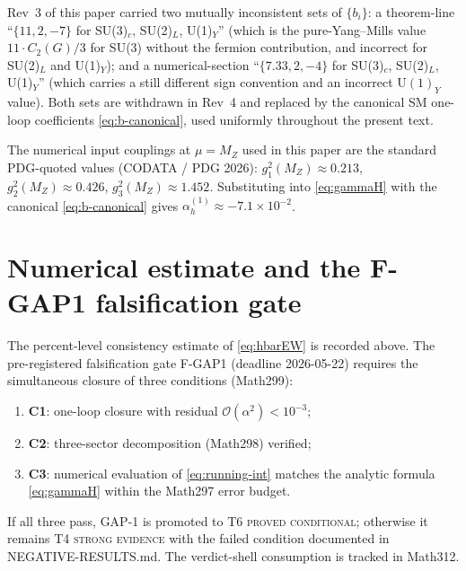 \begin{remark}\label{rmk:b-fixed}
Rev~3 of this paper carried two mutually inconsistent sets of
$\{b_i\}$: a theorem-line ``$\{11, 2, -7\}$ for SU(3)$_c$,
SU(2)$_L$, U(1)$_Y$'' (which is the pure-Yang--Mills value
$11\cdot C_2(G)/3$ for SU(3) without the fermion contribution, and
incorrect for SU(2)$_L$ and U(1)$_Y$); and a numerical-section
``$\{7.33, 2, -4\}$ for SU(3)$_c$, SU(2)$_L$, U(1)$_Y$''
(which carries a still different sign convention and an incorrect
$\mathrm{U}(1)_Y$ value). Both sets are withdrawn in Rev~4 and
replaced by the canonical SM one-loop coefficients
\eqref{eq:b-canonical}, used uniformly throughout the present text.
\end{remark}

The numerical input couplings at $\mu = M_Z$ used in this paper are
the standard PDG-quoted values (CODATA / PDG 2026):
$g_1^{2}(M_Z) \approx 0.213$, $g_2^{2}(M_Z) \approx 0.426$,
$g_3^{2}(M_Z) \approx 1.452$. Substituting into \eqref{eq:gammaH}
with the canonical \eqref{eq:b-canonical} gives
$\alpha_h^{(1)} \approx -7.1 \times 10^{-2}$.

\section{Numerical estimate and the F-GAP1 falsification gate}
\label{sec:falsification}

The percent-level consistency estimate of \eqref{eq:hbarEW} is
recorded above. The pre-registered falsification gate F-GAP1
(deadline 2026-05-22) requires the simultaneous closure of three
conditions (Math299):
\begin{enumerate}
  \item \textbf{C1}: one-loop closure with residual
    $\mathcal{O}(\alpha^2) < 10^{-3}$;
  \item \textbf{C2}: three-sector decomposition (Math298) verified;
  \item \textbf{C3}: numerical evaluation of \eqref{eq:running-int}
    matches the analytic formula \eqref{eq:gammaH} within the
    Math297 error budget.
\end{enumerate}
If all three pass, GAP-1 is promoted to T6 \textsc{proved
conditional}; otherwise it remains T4 \textsc{strong evidence} with
the failed condition documented in NEGATIVE-RESULTS.md. The
verdict-shell consumption is tracked in Math312.

